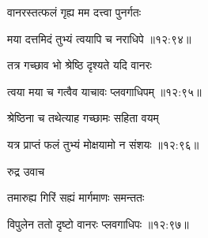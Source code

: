 {\devanagarifont वानरस्तत्फलं गृह्य मम दत्त्वा पुनर्गतः \thinspace{\dandab} \dontdisplaylinenum }%


{\devanagarifont मया दत्तमिदं तुभ्यं त्वयापि च नराधिपे {॥१२:९४॥} \veg\dontdisplaylinenum }%

{\devanagarifont तत्र गच्छाव भो श्रेष्ठि दृश्यते यदि वानरः \thinspace{\dandab} \dontdisplaylinenum }%
 

{\devanagarifont त्वया मया च गत्वैव याचावः प्लवगाधिपम् {॥१२:९५॥} \veg\dontdisplaylinenum }%

{\devanagarifont श्रेष्ठिना च तथेत्याह गच्छामः सहिता वयम् \thinspace{\dandab} \dontdisplaylinenum }%


{\devanagarifont यत्र प्राप्तं फलं तुभ्यं मोक्षयामो न संशयः {॥१२:९६॥} \veg\dontdisplaylinenum }%

{\devanagarifont रुद्र उवाच {\dandab}\dontdisplaylinenum  }%
 
{\devanagarifont तमारुह्य गिरिं सह्यं मार्गमाणः समन्ततः \thinspace{\danda} \dontdisplaylinenum }%


{\devanagarifont विपुलेन ततो दृष्टो वानरः प्लवगाधिपः {॥१२:९७॥} \veg\dontdisplaylinenum }%

